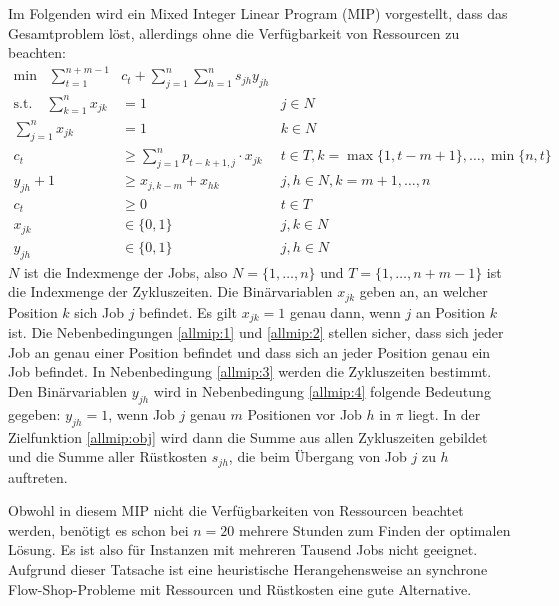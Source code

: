\documentclass{scrreprt}
\begin{document}
Im Folgenden wird ein Mixed Integer Linear Program (MIP) vorgestellt, dass das Gesamtproblem löst, allerdings ohne die Verfügbarkeit von Ressourcen zu beachten:
\begin{align}
    \text{min} \quad \sum_{t=1}^{n+m-1} &c_t + \sum_{j=1}^n \sum_{h=1}^n s_{jh} y_{jh} \label{allmip:obj}\\
    \text{s.t.}\quad \sum_{k=1}^n x_{jk} &= 1 & j\in N \label{allmip:1}\\
                     \sum_{j=1}^n x_{jk} &= 1 & k\in N \label{allmip:2}\\
    c_t &\geq \sum_{j=1}^n p_{t-k+1,j} \cdot x_{jk} & t\in T, k=\max\{1,t-m+1\},\ldots,\min\{n,t\} \label{allmip:3}\\
    y_{jh} + 1 &\geq x_{j,k-m} + x_{hk} & j,h\in N, k=m+1,\ldots,n \label{allmip:4}\\
    c_t &\geq 0 & t\in T \\
    x_{jk} &\in \{0,1\} & j,k\in N \\
    y_{jh} &\in \{0,1\} & j,h\in N
\end{align}
$N$ ist die Indexmenge der Jobs, also $N=\{1,\ldots,n\}$ und $T=\{1,\ldots,n+m-1\}$ ist die Indexmenge der Zykluszeiten.
Die Binärvariablen $x_{jk}$ geben an, an welcher Position $k$
sich Job $j$ befindet. Es gilt $x_{jk}=1$ genau dann, wenn $j$ an
Position $k$ ist. Die Nebenbedingungen \ref{allmip:1} und \ref{allmip:2}
stellen sicher, dass sich jeder Job an genau einer Position befindet und 
dass sich an jeder Position genau ein Job befindet.
In Nebenbedingung \ref{allmip:3} werden die Zykluszeiten bestimmt.
Den Binärvariablen $y_{jh}$ wird in Nebenbedingung \ref{allmip:4} folgende
Bedeutung gegeben: $y_{jh}=1$, wenn Job $j$ genau $m$ Positionen
vor Job $h$ in $\pi$ liegt.
In der Zielfunktion \ref{allmip:obj} wird dann die Summe aus allen
Zykluszeiten gebildet und die Summe aller Rüstkosten $s_{jh}$, die beim
Übergang von Job $j$ zu $h$ auftreten.

Obwohl in diesem MIP nicht die Verfügbarkeiten von Ressourcen beachtet werden,
benötigt es schon bei $n=20$ mehrere Stunden zum Finden der optimalen Lösung.
Es ist also für Instanzen mit mehreren Tausend Jobs nicht geeignet.
Aufgrund dieser Tatsache ist eine heuristische Herangehensweise an 
synchrone Flow-Shop-Probleme mit Ressourcen und Rüstkosten eine gute Alternative.
\end{document}
